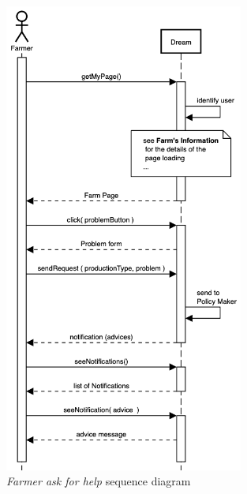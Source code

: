 \begin{enumerate}
    \begin{figure}[H]
        \begin{center}
        \includegraphics[width=0.7\textwidth]{sequence/HelpRequest.png}
        \caption{\emph{Farmer ask for help} sequence diagram}
        \label{fig:sequence7}
        \end{center}
    \end{figure}


\end{enumerate}
